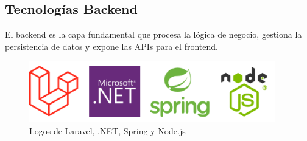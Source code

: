 \subsection{Tecnologías Backend}


El backend es la capa fundamental que procesa la lógica de negocio, gestiona la persistencia de datos y expone las APIs para el frontend.

\begin{figure}[H]
    \begin{center}
        \includegraphics[width = 0.95\textwidth]{Figuras/logoslaravelnetspringnodejs.png}
    \end{center}
    \caption{\label{fig:logoslaravelnetspringnodejs} Logos de Laravel, .NET, Spring y Node.js}
\end{figure}

